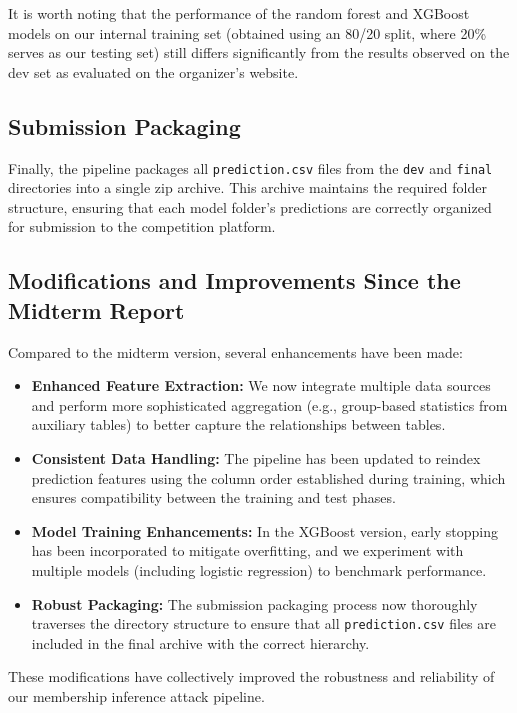 \documentclass[12pt]{article}
\begin{document}
It is worth noting that the performance of the random forest and XGBoost models on our internal training set (obtained using an 80/20 split, where 20\% serves as our testing set) still differs significantly from the results observed on the dev set as evaluated on the organizer's website.

\subsection{Submission Packaging}
Finally, the pipeline packages all \texttt{prediction.csv} files from the \texttt{dev} and \texttt{final} directories into a single zip archive. This archive maintains the required folder structure, ensuring that each model folder’s predictions are correctly organized for submission to the competition platform.

\subsection{Modifications and Improvements Since the Midterm Report}
Compared to the midterm version, several enhancements have been made:
\begin{itemize}
    \item \textbf{Enhanced Feature Extraction:} We now integrate multiple data sources and perform more sophisticated aggregation (e.g., group-based statistics from auxiliary tables) to better capture the relationships between tables.
    \item \textbf{Consistent Data Handling:} The pipeline has been updated to reindex prediction features using the column order established during training, which ensures compatibility between the training and test phases.
    \item \textbf{Model Training Enhancements:} In the XGBoost version, early stopping has been incorporated to mitigate overfitting, and we experiment with multiple models (including logistic regression) to benchmark performance.
    \item \textbf{Robust Packaging:} The submission packaging process now thoroughly traverses the directory structure to ensure that all \texttt{prediction.csv} files are included in the final archive with the correct hierarchy.
\end{itemize}
These modifications have collectively improved the robustness and reliability of our membership inference attack pipeline.


\end{document}
